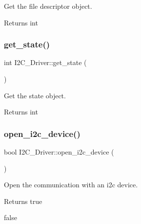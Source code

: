 Get the file descriptor object. 

\begin{DoxyReturn}{Returns}
int 
\end{DoxyReturn}
\mbox{\label{class_i2_c___driver_acb63f4cd021237147ee12d264bd34231}} 
\subsubsection{\texorpdfstring{get\+\_\+state()}{get\_state()}}
{\footnotesize\ttfamily int I2\+C\+\_\+\+Driver\+::get\+\_\+state (\begin{DoxyParamCaption}{ }\end{DoxyParamCaption})}



Get the state object. 

\begin{DoxyReturn}{Returns}
int 
\end{DoxyReturn}
\mbox{\label{class_i2_c___driver_a83291e51d4b09295b4e9562a01f80a2b}} 
\subsubsection{\texorpdfstring{open\+\_\+i2c\+\_\+device()}{open\_i2c\_device()}}
{\footnotesize\ttfamily bool I2\+C\+\_\+\+Driver\+::open\+\_\+i2c\+\_\+device (\begin{DoxyParamCaption}{ }\end{DoxyParamCaption})}



Open the communication with an i2c device. 

\begin{DoxyReturn}{Returns}
true 

false 
\end{DoxyReturn}
\mbox{\label{class_i2_c___driver_ad1e1489f831a8b2d30d6a52682d82c7a}} 
